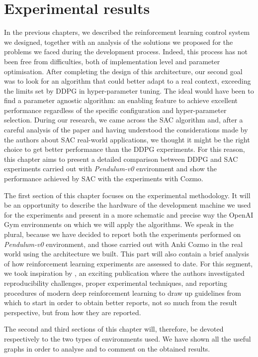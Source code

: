 \chapter{Experimental results} \label{ch:ch5}

In the previous chapters, we described the reinforcement learning control system we designed, together with an analysis of the solutions we proposed for the problems we faced during the development process.
Indeed, this process has not been free from difficulties, both of implementation level and parameter optimisation.
After completing the design of this architecture, our second goal was to look for an algorithm that could better adapt to a real context, exceeding the limits set by DDPG in hyper-parameter tuning.
The ideal would have been to find a parameter agnostic algorithm: an enabling feature to achieve excellent performance regardless of the specific configuration and hyper-parameter selection.
During our research, we came across the SAC algorithm and, after a careful analysis of the paper and having understood the considerations made by the authors about SAC real-world applications, we thought it might be the right choice to get better performance than the DDPG experiments.
For this reason, this chapter aims to present a detailed comparison between DDPG and SAC experiments carried out with \textit{Pendulum-v0} environment and show the performance achieved by SAC with the experiments with Cozmo.

The first section of this chapter focuses on the experimental methodology.
It will be an opportunity to describe the hardware of the development machine we used for the experiments and present in a more schematic and precise way the OpenAI Gym environments on which we will apply the algorithms.
We speak in the plural, because we have decided to report both the experiments performed on \textit{Pendulum-v0} environment, and those carried out with Anki Cozmo in the real world using the architecture we built.
This part will also contain a brief analysis of how reinforcement learning experiments are assessed to date.
For this segment, we took inspiration by \cite{henderson2018deep}, an exciting publication where the authors investigated reproducibility challenges, proper experimental techniques, and reporting procedures of modern deep reinforcement learning to draw up guidelines from which to start in order to obtain better reports, not so much from the result perspective, but from how they are reported.

The second and third sections of this chapter will, therefore, be devoted respectively to the two types of environments used.
We have shown all the useful graphs in order to analyse and to comment on the obtained results.

